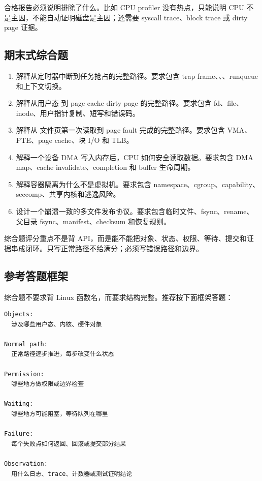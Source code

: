 合格报告必须说明排除了什么。比如 CPU profiler 没有热点，只能说明 CPU 不是主因，不能自动证明磁盘是主因；还需要 syscall trace、block trace 或 dirty page 证据。

\subsection{期末式综合题}

\begin{enumerate}
\item 解释从定时器中断到任务抢占的完整路径。要求包含 trap frame、、、runqueue 和上下文切换。
\item 解释从用户态  到 page cache dirty page 的完整路径。要求包含 fd、file、inode、用户指针复制、短写和错误码。
\item 解释从  文件页第一次读取到 page fault 完成的完整路径。要求包含 VMA、PTE、page cache、块 I/O 和 TLB。
\item 解释一个设备 DMA 写入内存后，CPU 如何安全读取数据。要求包含 DMA map、cache invalidate、completion 和 buffer 生命周期。
\item 解释容器隔离为什么不是虚拟机。要求包含 namespace、cgroup、capability、seccomp、共享内核和逃逸风险。
\item 设计一个崩溃一致的多文件发布协议。要求包含临时文件、fsync、rename、父目录 fsync、manifest、checksum 和恢复规则。
\end{enumerate}

\begin{rubricbox}
综合题评分重点不是背 API，而是能不能把对象、状态、权限、等待、提交和证据串成闭环。只写正常路径不给满分；必须写错误路径和边界。
\end{rubricbox}

\subsection{参考答题框架}

综合题不要求背 Linux 函数名，而要求结构完整。推荐按下面框架答题：

\begin{lstlisting}
Objects:
  涉及哪些用户态、内核、硬件对象

Normal path:
  正常路径逐步推进，每步改变什么状态

Permission:
  哪些地方做权限或边界检查

Waiting:
  哪些地方可能阻塞，等待队列在哪里

Failure:
  每个失败点如何返回、回滚或提交部分结果

Observation:
  用什么日志、trace、计数器或测试证明结论
\end{lstlisting}

